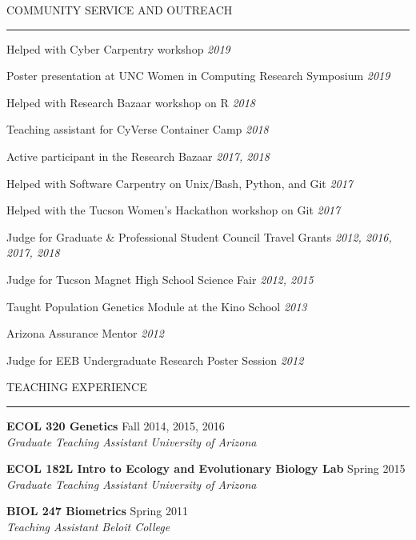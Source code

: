 \documentclass{resume} %
\renewenvironment{rSection}[1]{
\sectionskip
\textcolor{RoyalPurple}{\MakeUppercase{#1}}
\sectionlineskip
\hrule
\begin{list}{}{
\setlength{\leftmargin}{1.5em}
}
\item[]
}{
\end{list}
}
\begin{document}
\begin{rSection}{Community Service and Outreach}

\item Helped with Cyber Carpentry workshop \hfill {\em 2019}
\item Poster presentation at UNC Women in Computing Research Symposium \hfill {\em 2019}
\item Helped with Research Bazaar workshop on R \hfill {\em 2018}
\item Teaching assistant for CyVerse Container Camp \hfill {\em 2018}
\item Active participant in the Research Bazaar \hfill {\em 2017, 2018}
\item Helped with Software Carpentry on Unix/Bash, Python, and Git \hfill {\em 2017}
\item Helped with the Tucson Women’s Hackathon workshop on Git \hfill {\em 2017}
\item Judge for Graduate \& Professional Student Council Travel Grants \hfill {\em 2012, 2016, 2017, 2018}
\item Judge for Tucson Magnet High School Science Fair \hfill {\em 2012, 2015}
\item Taught Population Genetics Module at the Kino School \hfill {\em 2013}
\item Arizona Assurance Mentor \hfill {\em 2012}
\item Judge for EEB Undergraduate Research Poster Session \hfill {\em 2012}

\end{rSection}


\begin{rSection}{Teaching Experience}

{\bf ECOL 320 Genetics} \hfill Fall 2014, 2015, 2016 \\ 
{\em Graduate Teaching Assistant} \hfill {\em University of Arizona}

{\bf ECOL 182L Intro to Ecology and Evolutionary Biology Lab} \hfill Spring 2015 \\ 
{\em Graduate Teaching Assistant} \hfill {\em University of Arizona}

{\bf BIOL 247 Biometrics} \hfill Spring 2011 \\ 
{\em Teaching Assistant} \hfill {\em Beloit College}


\end{rSection}
\end{document}
